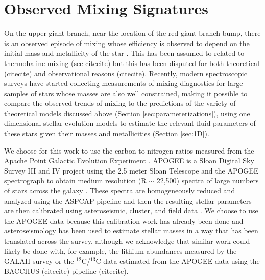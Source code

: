 \documentclass[linenumbers,twocolumn]{aastex62}
\newcommand{\ctwelvecthirteen}{$^{12}$C/$^{13}$C\xspace}
\begin{document}
\section{Observed Mixing Signatures} \label{sec:obs}
On the upper giant branch, near the location of the red giant branch bump, there is an observed episode of mixing whose efficiency is observed to depend on the initial mass and metallicity of the star \citep[e.g.][]{Gratton2000}. This has been assumed to related to thermohaline mixing (see citecite) but this has been disputed for both theoretical (citecite) and observational reasons \citep{TayarJoyce2022} (citecite). Recently, modern spectroscopic surveys have started collecting measurements of mixing diagnostics for large samples of stars whose masses are also well constrained, making it possible to compare the observed trends of mixing to the predictions of the variety of theoretical models discussed above (Section \ref{sec:parameterizations}), using one dimensional stellar evolution models to estimate the relevant fluid parameters of these stars given their masses and metallicities (Section \ref{sec:1D}). 

We choose for this work to use the carbon-to-nitrogen ratios measured from the Apache Point Galactic Evolution Experiment \citep[APOGEE, ][]{Majewski2015,Majewski2017}. APOGEE is a Sloan Digital Sky Survey III and IV \citep{Blanton2017} project using the 2.5 meter Sloan Telescope \citep{Gunn2006} and the APOGEE spectrograph \citep{Wilson2019} to obtain medium resolution (R $\sim$ 22,500) spectra of large numbers of stars across the galaxy \citep{Zasowski2017, Beaton2021,?}. These spectra are homogeneously reduced and analyzed using the ASPCAP pipeline \citep{Nidever2015, Zamora2015, GarciaPerez2016} and then the resulting stellar parameters are then calibrated using asteroseismic, cluster, and field data \citep{Holtzman2015,Holtzman2018, Jonsson2020}. We choose to use the APOGEE data because this calibration work has already been done and asteroseismology has been used to estimate stellar masses in a way that has been translated across the survey, although we acknowledge that similar work could likely be done with, for example, the lithium abundances measured by the GALAH survey \citep{buder2019} or the \ctwelvecthirteen data estimated from the APOGEE data using the BACCHUS (citecite) pipeline (citecite). 
\end{document}
